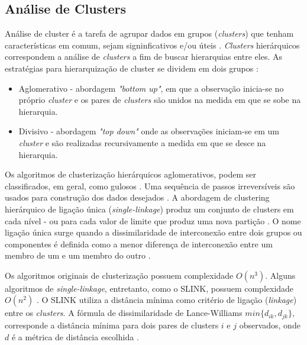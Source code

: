 \begin{document}

\subsection{Análise de Clusters} \label{ssec:clusters}

Análise de cluster é a tarefa de agrupar dados em grupos (\textit{clusters}) que tenham características em comum, sejam signinficativos e/ou úteis \cite{CLUSTER_HIER}. \textit{Clusters} hierárquicos correspondem a análise de \textit{clusters} a fim de buscar hierarquias entre eles. As estratégias para hierarquização de cluster se dividem em dois grupos \cite{ROKACH}:

\begin{itemize}
 \item Aglomerativo - abordagem \textit{"bottom up"}, em que a observação inicia-se no próprio \textit{cluster} e os pares de \textit{clusters} são unidos na medida em que se sobe na hierarquia. 
 \item Divisivo - abordagem \textit{"top down"} onde as observações iniciam-se em um \textit{cluster} e são realizadas recursivamente a medida em que se desce na hierarquia.
\end{itemize}

Os algoritmos de clusterização hierárquicos aglomerativos, podem ser classificados, em geral, como gulosos \cite{SINGLE_LINKAGE}. Uma sequência de passos irreversíveis são usados para construção dos dados desejados \cite{SINGLE_LINKAGE}. A abordagem de clustering hierárquico de ligação única (\textit{single-linkage}) produz um conjunto de clusters em cada nível - ou para cada valor de limite que produz uma nova partição \cite{SINGLE_LINKAGE}. O nome ligação única surge quando a dissimilaridade de interconexão entre dois grupos ou componentes é definida como a menor diferença de interconexão entre um membro de um e um membro do outro \cite{SINGLE_LINKAGE}.

Os algoritmos originais de clusterização possuem complexidade $O(n^3)$. Alguns algoritmos de \textit{single-linkage}, entretanto, como o SLINK, possuem complexidade $O(n^2)$ \cite{SLINK} \cite{SINGLE_LINKAGE}. O SLINK utiliza a distância mínima como critério de ligação (\textit{linkage}) entre os \textit{clusters}. A fórmula de dissimilaridade de Lance-Williams $min\{d_{ik}, d_{jk}\}$, corresponde a distância mínima para dois pares de clusters $i$ e $j$ observados, onde $d$ é a métrica de distância escolhida \cite{SINGLE_LINKAGE}.
\end{document}
